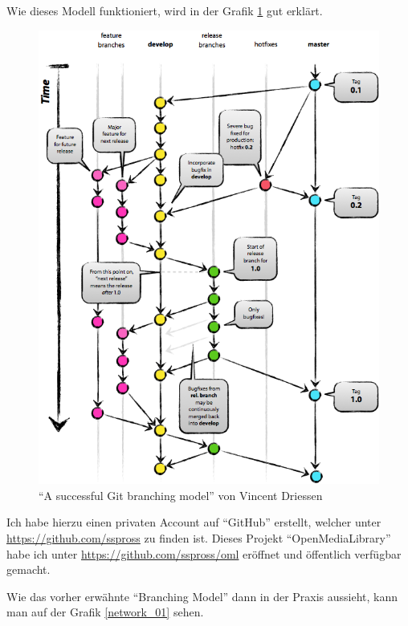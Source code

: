 Wie dieses Modell funktioniert, wird in der Grafik \ref{branching_model} gut erklärt.
 
\begin{figure}[ht]
    \begin{center}
        \includegraphics[width=1\textwidth,angle=0]{./bilder/branching_model.png}
        \caption{``A successful Git branching model'' von Vincent Driessen}
        \label{branching_model}
    \end{center}
\end{figure}

\clearpage

Ich habe hierzu einen privaten Account auf ``GitHub'' erstellt, welcher unter
\url{https://github.com/sspross} zu finden ist. Dieses Projekt ``OpenMediaLibrary''
habe ich unter \url{https://github.com/sspross/oml} eröffnet und öffentlich
verfügbar gemacht.

Wie das vorher erwähnte ``Branching Model'' dann in der Praxis aussieht, kann 
man auf der Grafik \ref{network_01} sehen.

